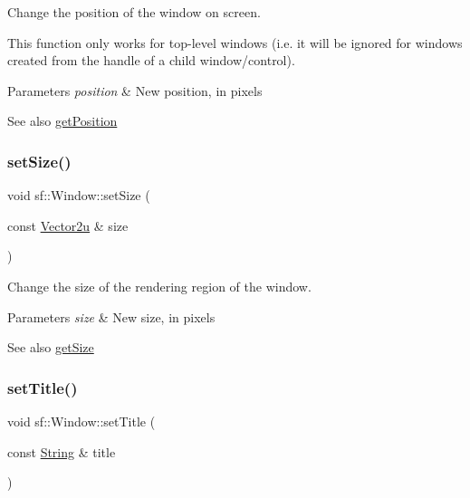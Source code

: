 Change the position of the window on screen. 

This function only works for top-\/level windows (i.\+e. it will be ignored for windows created from the handle of a child window/control).


\begin{DoxyParams}{Parameters}
{\em position} & New position, in pixels\\
\hline
\end{DoxyParams}
\begin{DoxySeeAlso}{See also}
\mbox{\hyperlink{classsf_1_1_window_a420028b8e4d9baedcaaba7b2047b8cb3}{get\+Position}} \begin{DoxyVerb}\end{DoxyVerb}
 
\end{DoxySeeAlso}
\mbox{\label{classsf_1_1_window_ab94ea32f22d15c0df11588e319de2546}} 
\subsubsection{\texorpdfstring{setSize()}{setSize()}}
{\footnotesize\ttfamily void sf\+::\+Window\+::set\+Size (\begin{DoxyParamCaption}\item[{const \mbox{\hyperlink{classsf_1_1_vector2}{Vector2u}} \&}]{size }\end{DoxyParamCaption})}



Change the size of the rendering region of the window. 


\begin{DoxyParams}{Parameters}
{\em size} & New size, in pixels\\
\hline
\end{DoxyParams}
\begin{DoxySeeAlso}{See also}
\mbox{\hyperlink{classsf_1_1_window_a3969926741cbe83d7f9eeaf5333d4e71}{get\+Size}} \begin{DoxyVerb}\end{DoxyVerb}
 
\end{DoxySeeAlso}
\mbox{\label{classsf_1_1_window_a3b3f3513bb6be90f5cd456c20b5fd5fa}} 
\subsubsection{\texorpdfstring{setTitle()}{setTitle()}}
{\footnotesize\ttfamily void sf\+::\+Window\+::set\+Title (\begin{DoxyParamCaption}\item[{const \mbox{\hyperlink{classsf_1_1_string}{String}} \&}]{title }\end{DoxyParamCaption})}



